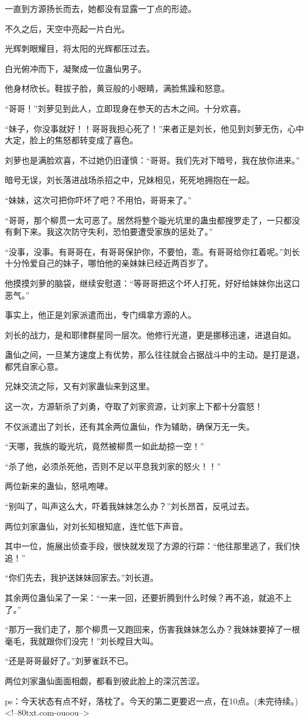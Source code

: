 \begin{this_body}
一直到方源扬长而去，她都没有显露一丁点的形迹。

不久之后，天空中亮起一片白光。

光辉刺眼耀目，将太阳的光辉都压过去。

白光俯冲而下，凝聚成一位蛊仙男子。

他身材欣长。鞋拔子脸，黄豆般的小眼睛，满脸焦躁和怒意。

“哥哥！”刘萝见到此人，立即现身在参天的古木之间。十分欢喜。

“妹子，你没事就好！！哥哥我担心死了！”来者正是刘长，他见到刘萝无伤，心中大定，脸上的焦怒都转变成了喜色。

刘萝也是满脸欢喜，不过她仍旧谨慎：“哥哥。我们先对下暗号，我在放你进来。”

暗号无误，刘长落进战场杀招之中，兄妹相见，死死地拥抱在一起。

“妹妹，这次可把你吓坏了吧？不用怕，哥哥来了。”

“哥哥，那个柳贯一太可恶了。居然将整个璇光坑里的蛊虫都搜罗走了，一只都没有剩下来。我这次防守失利，恐怕要遭受家族的惩处了。”

“没事，没事。有哥哥在，有哥哥保护你，不要怕，乖。有哥哥给你扛着呢。”刘长十分怜爱自己的妹子，哪怕他的亲妹妹已经近两百岁了。

他摸摸刘萝的脑袋，继续安慰道：“等哥哥把这个坏人打死，好好给妹妹你出这口恶气。”

事实上，他正是刘家派遣而出，专门缉拿方源的人。

刘长的战力，是和耶律群星同一层次。他修行光道，更是挪移迅速，进退自如。

蛊仙之间，一旦某方速度上有优势，那么往往就会占据战斗中的主动。是打是退，都凭自家心意。

兄妹交流之际，又有刘家蛊仙来到这里。

这一次，方源斩杀了刘勇，夺取了刘家资源，让刘家上下都十分震怒！

不仅派遣出了刘长，还有其余两位蛊仙，作为辅助，确保万无一失。

“天哪，我族的璇光坑，竟然被柳贯一如此劫掠一空！”

“杀了他，必须杀死他，否则不足以平息我刘家的怒火！！”

两位新来的蛊仙，怒吼咆哮。

“别叫了，叫声这么大，吓着我妹妹怎么办？”刘长昂首，反吼过去。

两位刘家蛊仙，对刘长知根知底，连忙低下声音。

其中一位，施展出侦查手段，很快就发现了方源的行踪：“他往那里逃了，我们快追！”

“你们先去，我护送妹妹回家去。”刘长道。

其余两位蛊仙呆了一呆：“一来一回，还要折腾到什么时候？再不追，就追不上了。”

“那万一我们走了，那个柳贯一又跑回来，伤害我妹妹怎么办？我妹妹要掉了一根毫毛，我就跟你们没完！”刘长瞠目大叫。

“还是哥哥最好了。”刘萝雀跃不已。

两位刘家蛊仙面面相觑，都看到彼此脸上的深沉苦涩。

ps：今天状态有点不好，落枕了。今天的第二更要迟一点，在10点。(未完待续。)<!--80txt.com-ouoou-->

\end{this_body}

